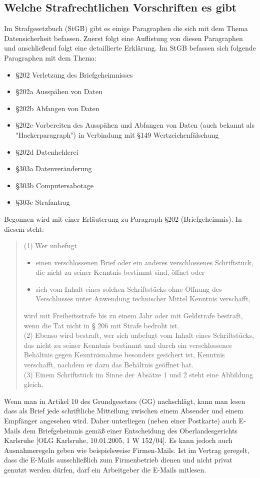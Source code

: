 \documentclass[10pt,a4paper]{article}
\begin{document}
\subsection*{Welche Strafrechtlichen Vorschriften es gibt}
Im Strafgesetzbuch (StGB) gibt es einige Paragraphen die sich mit dem Thema Datensicherheit befassen. Zuerst folgt eine Auflistung von diesen Paragraphen und anschließend folgt eine detaillierte Erklärung. Im StGB befassen sich folgende Paragraphen mit dem Thema:
\begin{itemize}
	\item §202 Verletzung des Briefgeheimnisses
	\item §202a Ausspähen von Daten
	\item §202b Abfangen von Daten
	\item §202c Vorbereiten des Ausspähen und Abfangen von Daten (auch bekannt als "Hackerparagraph") in Verbindung mit §149 Wertzeichenfälschung
	\item §202d Datenhehlerei
	\item §303a Datenveränderung
	\item §303b Computersabotage
	\item §303c Strafantrag 
\end{itemize}
Begonnen wird mit einer Erläuterung zu Paragraph §202 (Briefgeheimnis). In diesem steht:
\begin{quote}
(1) Wer unbefugt
\begin{itemize}
	\item[1.] einen verschlossenen Brief oder ein anderes verschlossenes Schriftstück, die nicht zu seiner Kenntnis bestimmt sind, öffnet oder
	\item[2.] sich vom Inhalt eines solchen Schriftstücks ohne Öffnung des Verschlusses unter Anwendung technischer Mittel Kenntnis verschafft,
\end{itemize}
wird mit Freiheitsstrafe bis zu einem Jahr oder mit Geldstrafe bestraft, wenn die Tat nicht in § 206 mit Strafe bedroht ist.\\
(2) Ebenso wird bestraft, wer sich unbefugt vom Inhalt eines Schriftstücks, das nicht zu seiner Kenntnis bestimmt und durch ein verschlossenes Behältnis gegen Kenntnisnahme besonders gesichert ist, Kenntnis verschafft, nachdem er dazu das Behältnis geöffnet hat.\\
(3) Einem Schriftstück im Sinne der Absätze 1 und 2 steht eine Abbildung gleich.
\end{quote}
Wenn man in Artikel 10 des Grundgesetzes (GG) nachschlägt, kann man lesen dass als Brief jede schriftliche Mitteilung zwischen einem Absender und einem Empfänger angesehen wird. Daher unterliegen (neben einer Postkarte) auch E-Mails  dem Briefgeheimnis gemäß einer Entscheidung des Oberlandesgerichts Karlsruhe [OLG Karlsruhe, 10.01.2005, 1 W 152/04]. Es kann jedoch auch Ausnahmeregeln geben wie beispielsweise Firmen-Mails. Ist im Vertrag geregelt, dass die E-Mails ausschließlich zum Firmenbetrieb dienen und nicht privat genutzt werden dürfen, darf ein Arbeitgeber die E-Mails mitlesen.
\end{document}
